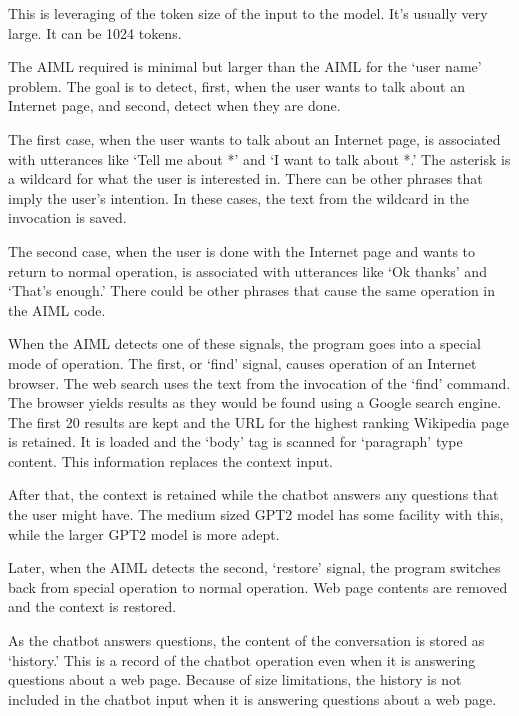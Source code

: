 This is leveraging of the token size of the input to the model. It's usually very large. It can be 1024 tokens.

The AIML required is minimal but larger than the AIML for the `user name' problem. The goal is to detect, first, when the user wants to talk about an Internet page, and second, detect when they are done.

The first case, when the user wants to talk about an Internet page, is associated with utterances like `Tell me about *' and `I want to talk about *.' The asterisk is a wildcard for what the user is interested in. There can be other phrases that imply the user's intention. In these cases, the text from the wildcard in the invocation is saved.

The second case, when the user is done with the Internet page and wants to return to normal operation, is associated with utterances like `Ok thanks' and `That's enough.' 
There could be other phrases that cause the same operation in the AIML code.

When the AIML detects one of these signals, the program goes into a special mode of operation. The first, or `find' signal, causes operation of an Internet browser. The web search uses the text from the invocation of the `find' command. The browser yields results as they would be found using a Google search engine. The first 20 results are kept and the URL for the highest ranking Wikipedia page is retained. It is loaded and the `body' tag is scanned for `paragraph' type content. This information replaces the context input. 

After that, the context is retained while the chatbot answers any questions that the user might have. The medium sized GPT2 model has some facility with this, while the larger GPT2 model is more adept.

Later, when the AIML detects the second, `restore' signal, the program switches back from special operation to normal operation. Web page contents are removed and the context is restored. %

As the chatbot answers questions, the content of the conversation is stored as `history.' %
This is a record of the chatbot operation even when it is answering questions about a web page. %
Because of size limitations, the history is not included in the chatbot input when it is answering questions about a web page. %

